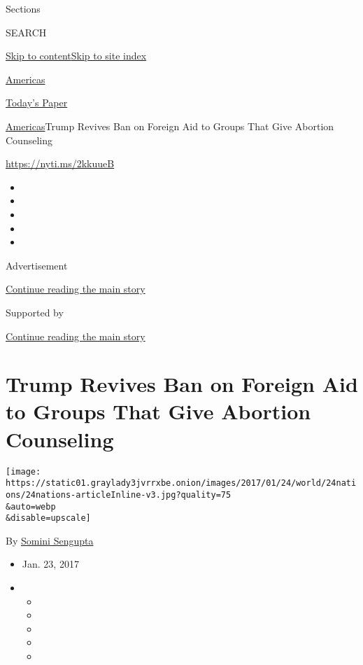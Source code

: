 Sections

SEARCH

\protect\hyperlink{site-content}{Skip to
content}\protect\hyperlink{site-index}{Skip to site index}

\href{https://www.nytimes3xbfgragh.onion/section/world/americas}{Americas}

\href{https://myaccount.nytimes3xbfgragh.onion/auth/login?response_type=cookie\&client_id=vi}{}

\href{https://www.nytimes3xbfgragh.onion/section/todayspaper}{Today's
Paper}

\href{/section/world/americas}{Americas}\textbar{}Trump Revives Ban on
Foreign Aid to Groups That Give Abortion Counseling

\url{https://nyti.ms/2kkuueB}

\begin{itemize}
\item
\item
\item
\item
\item
\end{itemize}

Advertisement

\protect\hyperlink{after-top}{Continue reading the main story}

Supported by

\protect\hyperlink{after-sponsor}{Continue reading the main story}

\hypertarget{trump-revives-ban-on-foreign-aid-to-groups-that-give-abortion-counseling}{%
\section{Trump Revives Ban on Foreign Aid to Groups That Give Abortion
Counseling}\label{trump-revives-ban-on-foreign-aid-to-groups-that-give-abortion-counseling}}

\texttt{[image: https://static01.graylady3jvrrxbe.onion/images/2017/01/24/world/24nations/24nations-articleInline-v3.jpg?quality=75\\\&auto=webp\\\&disable=upscale]}

By \href{http://www.nytimes3xbfgragh.onion/by/somini-sengupta}{Somini
Sengupta}

\begin{itemize}
\item
  Jan. 23, 2017
\item
  \begin{itemize}
  \item
  \item
  \item
  \item
  \item
  \end{itemize}
\end{itemize}

